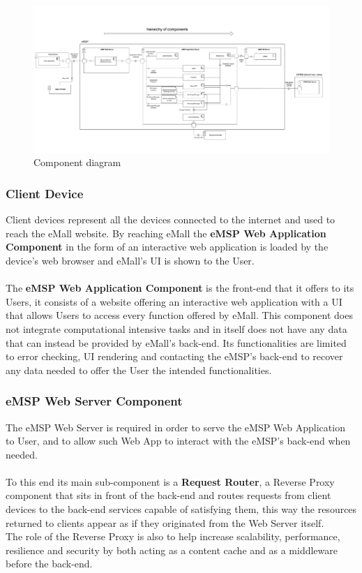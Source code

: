 \documentclass[11pt]{article}
\begin{document}
\newpage

\begin{figure}[!ht]
    \centerline{
        \includegraphics[page={2}, width=1.26\linewidth, trim=3cm 1cm 4cm 3cm, angle=-90, clip]{ComponentDiagram.pdf}
    }
    \caption{Component diagram}
\end{figure}

\newpage

\subsubsection{Client Device}

Client devices represent all the devices connected to the internet and used to reach the eMall website. By reaching eMall the \textbf{eMSP Web Application Component} in the form of an interactive web application is loaded by the device's web browser and eMall's UI is shown to the User.\\
\\
The \textbf{eMSP Web Application Component} is the front-end that it offers to its Users, it consists of a website offering an interactive web application with a UI that allows Users to access every function offered by eMall. This component does not integrate computational intensive tasks and in itself does not have any data that can instead be provided by eMall's back-end. Its functionalities are limited to error checking, UI rendering and contacting the eMSP's back-end to recover any data needed to offer the User the intended functionalities.

\subsubsection{eMSP Web Server Component}

The eMSP Web Server is required in order to serve the eMSP Web Application to User, and to allow such Web App to interact with the eMSP's back-end when needed. \\
\\
To this end its main sub-component is a \textbf{Request Router}, a Reverse Proxy component that sits in front of the back-end and routes requests from client devices to the back-end services capable of satisfying them, this way the resources returned to clients appear as if they originated from the Web Server itself. \\
The role of the Reverse Proxy is also to help increase scalability, performance, resilience and security by both acting as a content cache and as a middleware before the back-end. 
\end{document}

